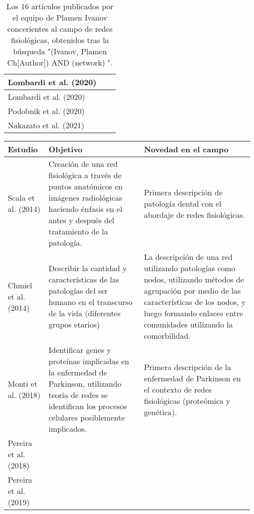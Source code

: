 \documentclass[twoside,twocolumn]{article}
\begin{document}
\begin{center}
\begin{table}[t]
\begin{tabular}{|p{4cm}p{6cm}p{5cm}|}
      Lombardi et al. (2020)\cite{lombardi2020power} &
      &
      \\ \hline
      Lombardi et al. (2020)\cite{lombardi2020critical} &
      &
      \\ \hline
      Podobnik et al. (2020)\cite{podobnik2020beta} &
      &
      \\ \hline
      Nakazato et al. (2021)\cite{ivanov2021signal} &
      &
      \\ \hline
    \end{tabular}
    \caption{Los 16 artículos publicados por el equipo de Plamen Ivanov concerientes al campo de redes fisiológicas, obtenidos tras la búsqueda "(Ivanov, Plamen Ch[Author]) AND (network) ".}
    \label{tab:plamenGroup}
  \end{table}
\end{center}
\begin{center}
  \begin{table}[t]
    \begin{tabular}{|p{4cm}p{6cm}p{5cm}|}
      \hline
      Estudio & Objetivo & Novedad en el campo \\
      \hline
      Scala et al. (2014) \cite{scala2014complex}&
        Creación de una red fisiológica a través de puntos anatómicos en imágenes radiológicas haciendo énfasis en el antes y después del tratamiento de la patología.
        & Primera descripción de patología dental con el abordaje de redes fisiológicas.
      \\\hline
      Chmiel et al. (2014) \cite{chmiel2014spreading} &
      Describir la cantidad y características de las patologías del ser humano en el transcurso de la vida (diferentes grupos etarios)
      &
      La descripción de una red utilizando patologías como nodos, utilizando métodos de agrupación por medio de las características de los nodos, y luego formando enlaces entre comunidades utilizando la comorbilidad.
      \\\hline
      Monti et al. (2018) \cite{monti2018network} &
      Identificar genes y proteínas implicadas en la enfermedad de Parkinson, utilizando teoría de redes se identifican los procesos celulares posiblemente implicados. & Primera descripción de la enfermedad de Parkinson en el contexto de redes fisiológicas (proteómica y genética).
      \\\hline
      Pereira et al. (2018) \cite{pereira2018computational} &
      &
      \\\hline
      Pereira et al. (2019) \cite{jansen2019network} &
      &
      \\\hline

\end{tabular}
\end{table}
\end{center}
\end{document}
